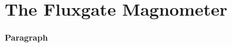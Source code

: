 \documentclass[../main.tex]{subfiles}
\begin{document}
\section{The Fluxgate Magnometer}
\barh 

\paragraph{Paragraph}
\end{document}

